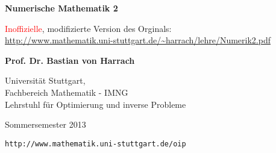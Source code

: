 \documentclass[
]{mycourse}
\theoremstyle{mythm}
\theoremstyle{break}
\begin{document}
%
%

\begin{titlepage}

	\vspace*{\fill}

\begin{center}
    \textbf{\Huge \sc Numerische Mathematik 2 }

	\vspace{1cm}
	{\Large \textcolor{red}{Inoffizielle}, modifizierte Version des Orginals:} \\
	\url{http://www.mathematik.uni-stuttgart.de/~harrach/lehre/Numerik2.pdf}
\end{center}

\vspace{2cm}

\begin{center}

{\Large \bf Prof. Dr. Bastian von Harrach}

\vspace{1cm}

{\Large Universität Stuttgart,\\[+1ex] Fachbereich Mathematik - IMNG\\[+1ex]
Lehrstuhl für Optimierung und inverse Probleme}

\vspace{1cm}

{\Large Sommersemester 2013}

\vspace{2cm}

{\verb|http://www.mathematik.uni-stuttgart.de/oip|}

\end{center} 

	\vspace*{\fill}
\end{titlepage}


\thispagestyle{empty}
\cleardoublepage
% 
%



\tableofcontents

\cleardoublepage
{}
\end{document}
